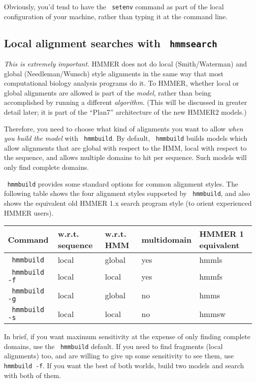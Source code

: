 \documentclass[11pt]{report}
\newcommand{\prog}[1]{\texttt{#1}}
\begin{document}
Obviously, you'd tend to have the \prog{ setenv} command as part of the
local configuration of your machine, rather than typing it at the
command line.

\subsection{Local alignment searches with \prog{ hmmsearch}}

{\em This is extremely important.} HMMER does not do local
(Smith/Waterman) and global (Needleman/Wunsch) style alignments in the
same way that most computational biology analysis programs do it.  To
HMMER, whether local or global alignments are allowed is part of the
{\em model}, rather than being accomplished by running a different
{\em algorithm}. (This will be discussed in greater detail later; it
is part of the ``Plan7'' architecture of the new HMMER2 models.)

Therefore, you need to choose what kind of alignments you want to
allow {\em when you build the model} with \prog{ hmmbuild}.  By default,
\prog{ hmmbuild} builds models which allow alignments that are global
with respect to the HMM, local with respect to the sequence, and
allows multiple domains to hit per sequence. Such models will only
find complete domains. 

\prog{ hmmbuild} provides some standard options for common alignment
styles. The following table shows the four alignment styles supported
by \prog{ hmmbuild}, and also shows the equivalent old HMMER 1.x search
program style (to orient experienced HMMER users).

\vspace{1em}
\begin{tabular}{lllll}
Command           & w.r.t. sequence & w.r.t. HMM & multidomain & HMMER
1 equivalent \\ \hline
\prog{ hmmbuild}    & local & global & yes & hmmls \\
\prog{ hmmbuild -f} & local & local  & yes & hmmfs \\
\prog{ hmmbuild -g} & local & global & no  & hmms  \\
\prog{ hmmbuild -s} & local & local  & no  & hmmsw \\ \hline
\end{tabular}
\vspace{1em}

In brief, if you want maximum sensitivity at the expense of only
finding complete domains, use the \prog{ hmmbuild} default. If you need
to find fragments (local alignments) too, and are willing to give up
some sensitivity to see them, use \prog{ hmmbuild -f}. If you want the
best of both worlds, build two models and search with both of them.
\end{document}
